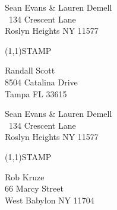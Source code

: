 \documentclass[12pt]{article}
\begin{document}
\clearpage

\begin{minipage}{.5\linewidth} \noindent
Sean Evans \& Lauren Demell\\\ 
134 Crescent Lane\\ 
Roslyn Heights NY 11577
\end{minipage}
\begin{minipage}{.5\linewidth \hspace{-.2in} \vspace{-.3in}}
\begin{flushright}
\framebox(1,1){STAMP}
\end{flushright}
\end{minipage}

\begin{center} \begin{Huge} \vspace*{\fill}
Randall Scott\\
8504 Catalina Drive\\
Tampa FL 33615\\
\vspace{\fill} \end{Huge} \end{center}

\clearpage

\begin{minipage}{.5\linewidth} \noindent
Sean Evans \& Lauren Demell\\\ 
134 Crescent Lane\\ 
Roslyn Heights NY 11577
\end{minipage}
\begin{minipage}{.5\linewidth \hspace{-.2in} \vspace{-.3in}}
\begin{flushright}
\framebox(1,1){STAMP}
\end{flushright}
\end{minipage}

\begin{center} \begin{Huge} \vspace*{\fill}
Rob Kruze\\
66 Marcy Street\\
West Babylon NY 11704\\
\vspace{\fill} \end{Huge} \end{center}

\clearpage
\end{document}
